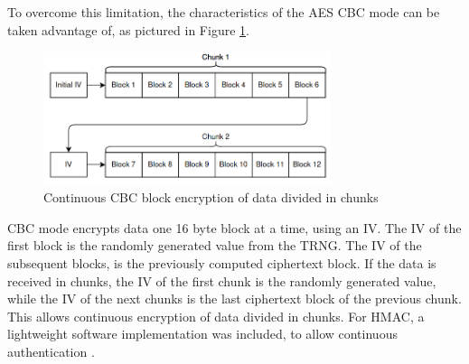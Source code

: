 To overcome this limitation, the characteristics of the AES CBC mode can be taken advantage of, as pictured in Figure \ref{fig:protocol:cbc-chunks}. 
\begin{figure}[h!]
	\centering
	\includegraphics[width=0.75\textwidth]{./Images/cbc-chunks.png}
	\caption{Continuous CBC block encryption of data divided in chunks}
	\label{fig:protocol:cbc-chunks}
\end{figure}
CBC mode encrypts data one 16 byte block at a time, using an IV. The IV of the first block is the randomly generated value from the TRNG. The IV of the subsequent blocks, is the previously computed ciphertext block.
If the data is received in chunks, the IV of the first chunk is the randomly generated value, while the IV of the next chunks is the last ciphertext block of the previous chunk.
This allows continuous encryption of data divided in chunks.
For HMAC, a lightweight software implementation was included, to allow continuous authentication \cite{ogayHMAC}.

